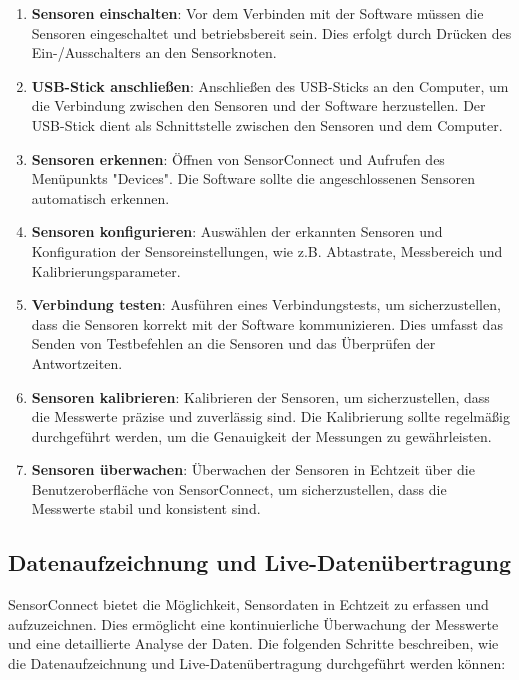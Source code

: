 \begin{enumerate}
    \item \textbf{Sensoren einschalten}: Vor dem Verbinden mit der Software müssen die Sensoren eingeschaltet und betriebsbereit sein. Dies erfolgt durch Drücken des Ein-/Ausschalters an den Sensorknoten.
    \item \textbf{USB-Stick anschließen}: Anschließen des USB-Sticks an den Computer, um die Verbindung zwischen den Sensoren und der Software herzustellen. Der USB-Stick dient als Schnittstelle zwischen den Sensoren und dem Computer.
    \item \textbf{Sensoren erkennen}: Öffnen von SensorConnect und Aufrufen des Menüpunkts "Devices". Die Software sollte die angeschlossenen Sensoren automatisch erkennen.
    \item \textbf{Sensoren konfigurieren}: Auswählen der erkannten Sensoren und Konfiguration der Sensoreinstellungen, wie z.B. Abtastrate, Messbereich und Kalibrierungsparameter.
    \item \textbf{Verbindung testen}: Ausführen eines Verbindungstests, um sicherzustellen, dass die Sensoren korrekt mit der Software kommunizieren. Dies umfasst das Senden von Testbefehlen an die Sensoren und das Überprüfen der Antwortzeiten.
    \item \textbf{Sensoren kalibrieren}: Kalibrieren der Sensoren, um sicherzustellen, dass die Messwerte präzise und zuverlässig sind. Die Kalibrierung sollte regelmäßig durchgeführt werden, um die Genauigkeit der Messungen zu gewährleisten.
    \item \textbf{Sensoren überwachen}: Überwachen der Sensoren in Echtzeit über die Benutzeroberfläche von SensorConnect, um sicherzustellen, dass die Messwerte stabil und konsistent sind.
\end{enumerate}

\subsection{Datenaufzeichnung und Live-Datenübertragung}
SensorConnect bietet die Möglichkeit, Sensordaten in Echtzeit zu erfassen und aufzuzeichnen. Dies ermöglicht eine kontinuierliche Überwachung der Messwerte und eine detaillierte Analyse der Daten. Die folgenden Schritte beschreiben, wie die Datenaufzeichnung und Live-Datenübertragung durchgeführt werden können:

